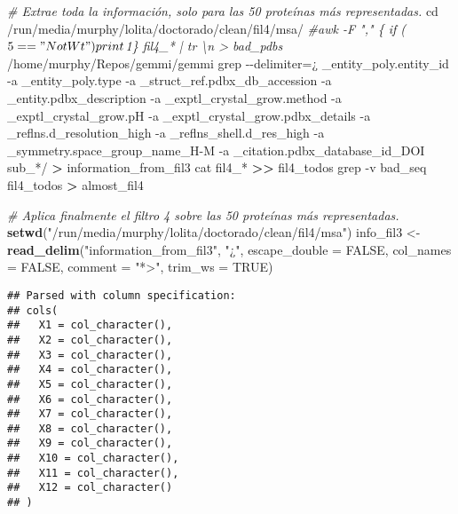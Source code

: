 \documentclass[
]{book}
\newenvironment{Shaded}{\begin{snugshade}}{\end{snugshade}}
\newcommand{\BuiltInTok}[1]{#1}
\newcommand{\CommentTok}[1]{\textcolor[rgb]{0.56,0.35,0.01}{\textit{#1}}}
\newcommand{\DataTypeTok}[1]{\textcolor[rgb]{0.13,0.29,0.53}{#1}}
\newcommand{\ExtensionTok}[1]{#1}
\newcommand{\FunctionTok}[1]{\textcolor[rgb]{0.00,0.00,0.00}{#1}}
\newcommand{\KeywordTok}[1]{\textcolor[rgb]{0.13,0.29,0.53}{\textbf{#1}}}
\newcommand{\NormalTok}[1]{#1}
\newcommand{\OperatorTok}[1]{\textcolor[rgb]{0.81,0.36,0.00}{\textbf{#1}}}
\newcommand{\OtherTok}[1]{\textcolor[rgb]{0.56,0.35,0.01}{#1}}
\newcommand{\StringTok}[1]{\textcolor[rgb]{0.31,0.60,0.02}{#1}}
\begin{document}
\begin{Shaded}
\begin{Highlighting}[]
\CommentTok{\# Extrae toda la información, solo para las 50 proteínas más representadas.}
\BuiltInTok{cd}\NormalTok{ /run/media/murphy/lolita/doctorado/clean/fil4/msa/}
\CommentTok{\#awk {-}F "," \textquotesingle{}\{ if ($5=="NotWt") print $1\}\textquotesingle{} fil4\_*  | tr \textquotesingle{}\textbackslash{}n\textquotesingle{} \textquotesingle{} \textquotesingle{}  \textgreater{} bad\_pdbs}
\ExtensionTok{/home/murphy/Repos/gemmi/gemmi}\NormalTok{ grep {-}{-}delimiter=}\StringTok{\textquotesingle{}¿\textquotesingle{}}\NormalTok{ \_entity\_poly.entity\_id {-}a \_entity\_poly.type {-}a \_struct\_ref.pdbx\_db\_accession {-}a \_entity.pdbx\_description {-}a \_exptl\_crystal\_grow.method {-}a \_exptl\_crystal\_grow.pH {-}a \_exptl\_crystal\_grow.pdbx\_details {-}a \_reflns.d\_resolution\_high {-}a \_reflns\_shell.d\_res\_high {-}a \_symmetry.space\_group\_name\_H{-}M {-}a \_citation.pdbx\_database\_id\_DOI sub\_*/ }\OperatorTok{\textgreater{}}\NormalTok{ information\_from\_fil3}
\FunctionTok{cat}\NormalTok{ fil4\_* }\OperatorTok{\textgreater{}\textgreater{}}\NormalTok{ fil4\_todos}
\FunctionTok{grep}\NormalTok{ {-}v bad\_seq fil4\_todos }\OperatorTok{\textgreater{}}\NormalTok{ almost\_fil4}
\end{Highlighting}
\end{Shaded}

\begin{Shaded}
\begin{Highlighting}[]
\CommentTok{\# Aplica finalmente el filtro 4 sobre las 50 proteínas más representadas.}
\KeywordTok{setwd}\NormalTok{(}\StringTok{"/run/media/murphy/lolita/doctorado/clean/fil4/msa"}\NormalTok{)}
\NormalTok{info\_fil3 \textless{}{-}}\StringTok{ }\KeywordTok{read\_delim}\NormalTok{(}\StringTok{"information\_from\_fil3"}\NormalTok{, }\StringTok{"¿"}\NormalTok{, }\DataTypeTok{escape\_double =} \OtherTok{FALSE}\NormalTok{, }\DataTypeTok{col\_names =} \OtherTok{FALSE}\NormalTok{, }\DataTypeTok{comment =} \StringTok{"*\textgreater{}"}\NormalTok{, }\DataTypeTok{trim\_ws =} \OtherTok{TRUE}\NormalTok{)}
\end{Highlighting}
\end{Shaded}

\begin{verbatim}
## Parsed with column specification:
## cols(
##   X1 = col_character(),
##   X2 = col_character(),
##   X3 = col_character(),
##   X4 = col_character(),
##   X5 = col_character(),
##   X6 = col_character(),
##   X7 = col_character(),
##   X8 = col_character(),
##   X9 = col_character(),
##   X10 = col_character(),
##   X11 = col_character(),
##   X12 = col_character()
## )
\end{verbatim}
\end{document}
